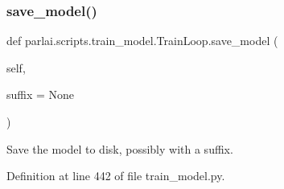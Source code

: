 \mbox{\label{classparlai_1_1scripts_1_1train__model_1_1TrainLoop_a352f759a644e87251c37931bf276309a}} 
\subsubsection{\texorpdfstring{save\+\_\+model()}{save\_model()}}
{\footnotesize\ttfamily def parlai.\+scripts.\+train\+\_\+model.\+Train\+Loop.\+save\+\_\+model (\begin{DoxyParamCaption}\item[{}]{self,  }\item[{}]{suffix = {\ttfamily None} }\end{DoxyParamCaption})}

\begin{DoxyVerb}Save the model to disk, possibly with a suffix.
\end{DoxyVerb}
 

Definition at line 442 of file train\+\_\+model.\+py.


